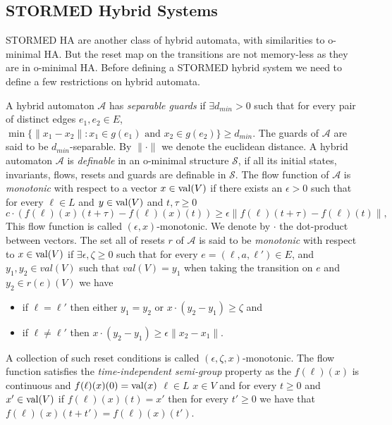 \subsection{STORMED Hybrid Systems}
STORMED HA are another class of hybrid automata, with similarities to o-minimal HA. But the reset map on the transitions are not memory-less as they are in o-minimal HA. Before defining a STORMED hybrid system we need to define a few restrictions on hybrid automata.

A hybrid automaton $\mathcal{A}$ has \emph{separable guards} if $\exists d_{min} > 0$ such that for every pair of distinct edges $e_{1},e_{2}\in E$,
$\min\{\| x_{1}-x_{2}\| : x_{1}\in g(e_{1}) \text{ and } x_{2}\in g(e_{2})\} \geq d_{min}$. The guards of $\mathcal{A}$ are said to be $d_{min}$-separable. By $\| \cdot \|$ we denote the euclidean distance.
A hybrid automaton $\mathcal{A}$ is \emph{definable} in an o-minimal structure $\mathcal{S}$, if all its initial states, invariants, flows, resets and guards are definable in $\mathcal{S}$.
The flow function of $\mathcal{A}$ is \emph{monotonic} with respect to a vector $x\in \operatorname{val}(V)$ if there exists an $\epsilon > 0$ such that for every $\ell\in L$ and $y\in\operatorname{val}(V)$ and $t,\tau \geq 0$
\[
c \cdot (f(\ell)(x)(t+\tau)-f(\ell)(x)(t)) \geq \epsilon\| f(\ell)(t+\tau)-f(\ell)(t)\|,
\]
This flow function is called $(\epsilon,x)$-monotonic.
We denote by $\cdot$ the dot-product between vectors.
The set all of resets $r$ of $\mathcal{A}$ is said to be \emph{monotonic} with respect to $x\in\operatorname{val}(V)$ if $\exists \epsilon,\zeta\geq0$ such that for every $e=(\ell,a,\ell')\in E$, and $y_{1},y_{2}\in val(V)$ such that $val(V)=y_{1}$ when taking the transition on $e$ and $y_{2}\in r(e)(V)$ we have
\begin{itemize}
    \item if $\ell=\ell'$ then either $y_{1}=y_{2}$ or $x\cdot(y_{2}-y_{1})\geq\zeta$ and
    \item if $\ell\neq\ell'$ then  $x\cdot(y_{2}-y_{1})\geq\epsilon\|x_{2}-x_{1}\|.$
\end{itemize}
A collection of such reset conditions is called $(\epsilon,\zeta,x)$-monotonic.
The flow function satisfies the \emph{time-independent semi-group} property as the $f(\ell)(x)$ is continuous and $f(\ell)(x)(0)=\operatorname{val}(x)$ $\ell\in L$ $x\in V$ and for every $t\geq 0$ and $x'\in \operatorname{val}(V)$ if $f(\ell)(x)(t) = x'$ then for every $t'\geq0$ we have that $f(\ell)(x)(t+t')=f(\ell)(x)(t')$.

